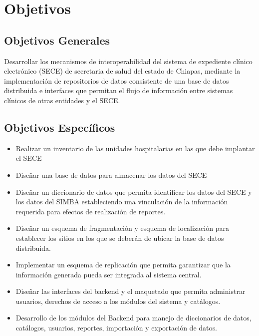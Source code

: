 \section{Objetivos}

    \subsection{Objetivos Generales}
    \label{subsec:objGrales}
    Desarrollar los mecanismos de interoperabilidad del sistema de expediente clínico
    electrónico (SECE) de secretaria de salud del estado de Chiapas, mediante la
    implementación de repositorios de datos consistente de una base de datos distribuida e
    interfaces que permitan el flujo de información entre sistemas clínicos de otras entidades
    y el SECE.

    \subsection{Objetivos Específicos}
    \label{subsec:objetivos especificos}
\begin{itemize}
\item Realizar un inventario de las unidades hospitalarias en las que debe implantar el
SECE
 \item Diseñar una base de datos para almacenar los datos del SECE
\item Diseñar un diccionario de datos que permita identificar los datos del SECE y los
datos del SIMBA estableciendo una vinculación de la información requerida para
efectos de realización de reportes.
\item Diseñar un esquema de fragmentación y esquema de localización para establecer
los sitios en los que se deberán de ubicar la base de datos distribuida.
\item Implementar un esquema de replicación que permita garantizar que la información
generada pueda ser integrada al sistema central.
\item Diseñar las interfaces del backend y el maquetado que permita administrar
usuarios, derechos de acceso a los módulos del sistema y catálogos.
\item Desarrollo de los módulos del Backend para manejo de diccionarios de datos,
catálogos, usuarios, reportes, importación y exportación de datos.

\end{itemize}
